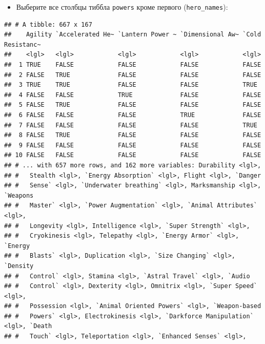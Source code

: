 \documentclass[]{book}
\newenvironment{Shaded}{\begin{snugshade}}{\end{snugshade}}
\newcommand{\KeywordTok}[1]{\textcolor[rgb]{0.13,0.29,0.53}{\textbf{#1}}}
\newcommand{\OperatorTok}[1]{\textcolor[rgb]{0.81,0.36,0.00}{\textbf{#1}}}
\newcommand{\NormalTok}[1]{#1}
\providecommand{\tightlist}{%
  \setlength{\itemsep}{0pt}\setlength{\parskip}{0pt}}
\begin{document}
\begin{itemize}
\tightlist
\item
  Выберите все столбцы тиббла \texttt{powers} кроме первого
  (\texttt{hero\_names}):
\end{itemize}

\begin{Shaded}
\end{Shaded}

\begin{verbatim}
## # A tibble: 667 x 167
##    Agility `Accelerated He~ `Lantern Power ~ `Dimensional Aw~ `Cold Resistanc~
##    <lgl>   <lgl>            <lgl>            <lgl>            <lgl>           
##  1 TRUE    FALSE            FALSE            FALSE            FALSE           
##  2 FALSE   TRUE             FALSE            FALSE            FALSE           
##  3 TRUE    TRUE             FALSE            FALSE            TRUE            
##  4 FALSE   FALSE            TRUE             FALSE            FALSE           
##  5 FALSE   TRUE             FALSE            FALSE            FALSE           
##  6 FALSE   FALSE            FALSE            TRUE             FALSE           
##  7 FALSE   FALSE            FALSE            FALSE            TRUE            
##  8 FALSE   TRUE             FALSE            FALSE            FALSE           
##  9 FALSE   FALSE            FALSE            FALSE            FALSE           
## 10 FALSE   FALSE            FALSE            FALSE            FALSE           
## # ... with 657 more rows, and 162 more variables: Durability <lgl>,
## #   Stealth <lgl>, `Energy Absorption` <lgl>, Flight <lgl>, `Danger
## #   Sense` <lgl>, `Underwater breathing` <lgl>, Marksmanship <lgl>, `Weapons
## #   Master` <lgl>, `Power Augmentation` <lgl>, `Animal Attributes` <lgl>,
## #   Longevity <lgl>, Intelligence <lgl>, `Super Strength` <lgl>,
## #   Cryokinesis <lgl>, Telepathy <lgl>, `Energy Armor` <lgl>, `Energy
## #   Blasts` <lgl>, Duplication <lgl>, `Size Changing` <lgl>, `Density
## #   Control` <lgl>, Stamina <lgl>, `Astral Travel` <lgl>, `Audio
## #   Control` <lgl>, Dexterity <lgl>, Omnitrix <lgl>, `Super Speed` <lgl>,
## #   Possession <lgl>, `Animal Oriented Powers` <lgl>, `Weapon-based
## #   Powers` <lgl>, Electrokinesis <lgl>, `Darkforce Manipulation` <lgl>, `Death
## #   Touch` <lgl>, Teleportation <lgl>, `Enhanced Senses` <lgl>,

\end{verbatim}
\end{document}
